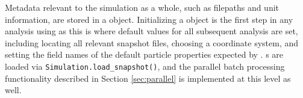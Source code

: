 \subsubsection{}
\label{sec:sim}
Metadata relevant to the simulation as a whole, such as filepaths and unit information, are stored in a  object.  Initializing a  object is the first step in any analysis using  as this is where default values for all subsequent analysis are set, including locating all relevant snapshot files, choosing a coordinate system, and setting the field names of the default particle properties expected by .  s are loaded via \verb|Simulation.load_snapshot()|, and the parallel batch processing functionality described in Section \ref{sec:parallel} is implemented at this level as well.